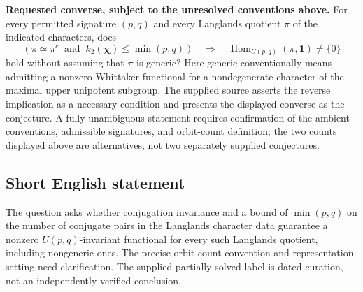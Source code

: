 \documentclass[11pt]{article}
\begin{document}
\textbf{Requested converse, subject to the unresolved conventions above.} For every permitted signature \((p,q)\) and every Langlands quotient \(\pi\) of the indicated characters, does
\[
\left(\pi\simeq\pi^c\ \text{ and }\ k_2(\boldsymbol\chi)\leq\min(p,q)\right)
\quad\Longrightarrow\quad
\operatorname{Hom}_{U(p,q)}(\pi,\mathbf 1)\ne\{0\}
\]
hold without assuming that \(\pi\) is generic? Here generic conventionally means admitting a nonzero Whittaker functional for a nondegenerate character of the maximal upper unipotent subgroup. The supplied source asserts the reverse implication as a necessary condition and presents the displayed converse as the conjecture. A fully unambiguous statement requires confirmation of the ambient conventions, admissible signatures, and orbit-count definition; the two counts displayed above are alternatives, not two separately supplied conjectures.
\subsection{Short English statement}
The question asks whether conjugation invariance and a bound of \(\min(p,q)\) on the number of conjugate pairs in the Langlands character data guarantee a nonzero \(U(p,q)\)-invariant functional for every such Langlands quotient, including nongeneric ones. The precise orbit-count convention and representation setting need clarification. The supplied partially solved label is dated curation, not an independently verified conclusion.
\end{document}
